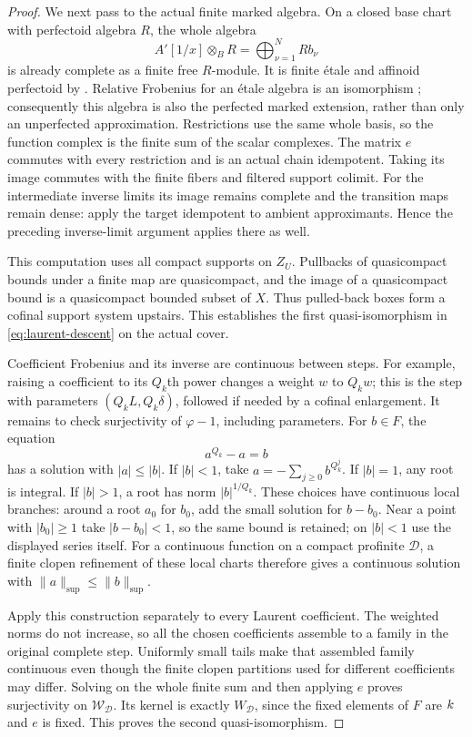 \begin{proof}
We next pass to the actual finite marked algebra.  On a closed base
chart with perfectoid algebra $R$, the whole algebra
\[
 A'[1/x]\otimes_B R=\bigoplus_{\nu=1}^N Rb_\nu
\]
is already complete as a finite free $R$-module.  It is finite
\'{e}tale and affinoid perfectoid by
\cite[Theorem~6.1(i)]{scholzeDiamonds2017}.  Relative Frobenius for an
\'{e}tale algebra is an isomorphism
\cite[Lemma~41.14.3, Tag~0EBS]{stacks}; consequently this algebra is
also the perfected marked extension, rather than only an
unperfected approximation.  Restrictions use the same whole basis,
so the function complex is the finite sum of the scalar complexes.
The matrix $e$ commutes with every restriction and is an actual chain
idempotent.  Taking its image commutes with the finite fibers and
filtered support colimit.  For the intermediate inverse limits its
image remains complete and the transition maps remain dense: apply
the target idempotent to ambient approximants.  Hence the preceding
inverse-limit argument applies there as well.

This computation uses all compact supports on $Z_U$.  Pullbacks of
quasicompact bounds under a finite map are quasicompact, and the image
of a quasicompact bound is a quasicompact bounded subset of $X$.
Thus pulled-back boxes form a cofinal support system upstairs.  This
establishes the first quasi-isomorphism in
\cref{eq:laurent-descent} on the actual cover.

Coefficient Frobenius and its inverse are continuous between steps.
For example, raising a coefficient to its $Q_k$th power changes a
weight $w$ to $Q_kw$; this is the step with parameters
$(Q_kL,Q_k\delta)$, followed if needed by a cofinal enlargement.
It remains to check surjectivity of $\varphi-1$, including parameters.
For $b\in F$, the equation
\[
 a^{Q_k}-a=b
\]
has a solution with $|a|\leq|b|$.  If $|b|<1$, take
$a=-\sum_{j\geq0}b^{Q_k^j}$.  If $|b|=1$, any root is integral.
If $|b|>1$, a root has norm $|b|^{1/Q_k}$.  These choices have
continuous local branches: around a root $a_0$ for $b_0$, add the
small solution for $b-b_0$.  Near a point with $|b_0|\geq1$ take
$|b-b_0|<1$, so the same bound is retained; on $|b|<1$ use the
displayed series itself.  For a continuous function on a compact
profinite $\mathcal D$, a finite clopen refinement of these local
charts therefore gives a continuous solution with
$\|a\|_{\sup}\leq\|b\|_{\sup}$.

Apply this construction separately to every Laurent coefficient.
The weighted norms do not increase, so all the chosen coefficients
assemble to a family in the original complete step.  Uniformly small
tails make that assembled family continuous even though the finite
clopen partitions used for different coefficients may differ.
Solving on the whole finite sum and then applying $e$ proves
surjectivity on $\mathscr W_{\mathcal D}$.  Its kernel is exactly
$W_{\mathcal D}$, since the fixed elements of $F$ are $k$ and $e$
is fixed.  This proves the second quasi-isomorphism.


\end{proof}
